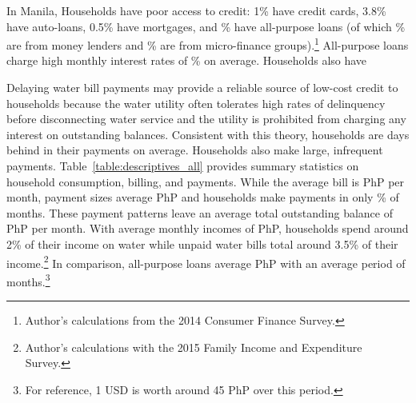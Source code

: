 \documentclass[12pt]{article}
\begin{document}
In Manila, Households have poor access to credit: 1\% have credit cards, 3.8\% have auto-loans, 0.5\% have mortgages, and \unskip\% have all-purpose loans (of which \unskip\% are from money lenders and \unskip\% are from micro-finance groups).\footnote{Author's calculations from the 2014 Consumer Finance Survey.}  All-purpose loans charge high monthly interest rates of \unskip\% on average.  Households also have 

Delaying water bill payments may provide a reliable source of low-cost credit to households because the water utility often tolerates high rates of delinquency before disconnecting water service and the utility is prohibited from charging any interest on outstanding balances.  Consistent with this theory, households are days behind in their payments on average.  Households also make large, infrequent payments.  Table~\ref{table:descriptives_all} provides summary statistics on household consumption, billing, and payments.  While the average bill is PhP per month, payment sizes average PhP and households make payments in only \unskip\% of months.  These payment patterns leave an average total outstanding balance of PhP per month.  With average monthly incomes of PhP, households spend around 2\% of their income on water while unpaid water bills total around 3.5\% of their income.\footnote{Author's calculations with the 2015 Family Income and Expenditure Survey.}  In comparison, all-purpose loans average PhP with an average period of months.\footnote{For reference, 1 USD is worth around 45 PhP over this period.}  

  
\end{document}
